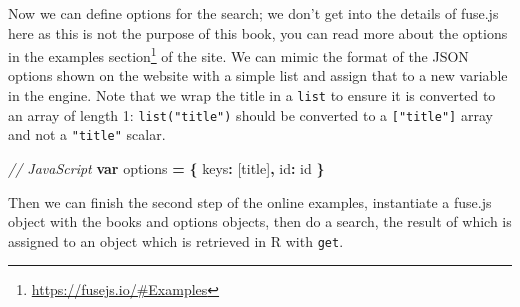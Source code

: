 \documentclass[
]{krantz}
\makeatletter
\newenvironment{Shaded}{\begin{snugshade}}{\end{snugshade}}
\newcommand{\CommentTok}[1]{\textcolor[rgb]{0.37,0.37,0.37}{\textit{#1}}}
\newcommand{\DataTypeTok}[1]{\textcolor[rgb]{0.27,0.27,0.27}{#1}}
\newcommand{\KeywordTok}[1]{\textcolor[rgb]{0.27,0.27,0.27}{\textbf{#1}}}
\newcommand{\NormalTok}[1]{#1}
\newcommand{\OperatorTok}[1]{\textcolor[rgb]{0.43,0.43,0.43}{\textbf{#1}}}
\newcommand{\StringTok}[1]{\textcolor[rgb]{0.5,0.5,0.5}{#1}}
\renewcommand{\href}[2]{#2\footnote{\url{#1}}}
\newenvironment{kframe}{%
\medskip{}
\setlength{\fboxsep}{.8em}
 \def\at@end@of@kframe{}%
 \ifinner\ifhmode%
  \def\at@end@of@kframe{\end{minipage}}%
  \begin{minipage}{\columnwidth}%
 \fi\fi%
 \def\FrameCommand##1{\hskip\@totalleftmargin \hskip-\fboxsep
 \colorbox{shadecolor}{##1}\hskip-\fboxsep
     \hskip-\linewidth \hskip-\@totalleftmargin \hskip\columnwidth}%
 \MakeFramed {\advance\hsize-\width
   \@totalleftmargin\z@ \linewidth\hsize
   \@setminipage}}%
 {\par\unskip\endMakeFramed%
 \at@end@of@kframe}
\renewenvironment{Shaded}{\begin{kframe}}{\end{kframe}}
\makeatother
\begin{document}
Now we can define options for the search; we don't get into the details of fuse.js here as this is not the purpose of this book, you can read more about the options in the \href{https://fusejs.io/\#Examples}{examples section} of the site. We can mimic the format of the JSON options shown on the website with a simple list and assign that to a new variable in the engine. Note that we wrap the title in a \texttt{list} to ensure it is converted to an array of length 1: \texttt{list("title")} should be converted to a \texttt{{[}"title"{]}} array and not a \texttt{"title"} scalar.

\begin{Shaded}
\begin{Highlighting}[]
\CommentTok{// JavaScript}
\KeywordTok{var}\NormalTok{ options }\OperatorTok{=} \OperatorTok{\{}
  \DataTypeTok{keys}\OperatorTok{:}\NormalTok{ [}\StringTok{\textquotesingle{}title\textquotesingle{}}\NormalTok{]}\OperatorTok{,}
  \DataTypeTok{id}\OperatorTok{:} \StringTok{\textquotesingle{}id\textquotesingle{}}
\OperatorTok{\}}
\end{Highlighting}
\end{Shaded}

\begin{Shaded}
\end{Shaded}

Then we can finish the second step of the online examples, instantiate a fuse.js object with the books and options objects, then do a search, the result of which is assigned to an object which is retrieved in R with \texttt{get}.

\begin{Shaded}
\end{Shaded}
\end{document}
